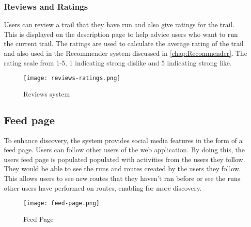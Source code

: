 \subsubsection{Reviews and Ratings}
Users can review a trail that they have run and also give ratings for the trail. This is displayed on the description page to help advice users who want to run the current trail. The ratings are used to calculate the average rating of the trail and also used in the Recommender system discussed in \autoref{chap:Recommender}. The rating scale \cite{wright1982rating} from 1-5, 1 indicating strong dislike and 5 indicating strong like.

\begin{figure}[htb!]
    \centering
    \texttt{[image: reviews-ratings.png]}
    \caption{Reviews system}
    \label{fig:reviews}
\end{figure}

\subsection{Feed page}
To enhance discovery, the system provides social media features in the form of a feed page. Users can follow other users of the web application. By doing this, the users feed page is populated populated with activities from the users they follow. They would be able to see the runs and routes created by the users they follow. This allows users to see new routes that they haven't ran before or see the runs other users have performed on routes, enabling for more discovery.

\begin{figure}[htb!]
    \centering
    \texttt{[image: feed-page.png]}
    \caption{Feed Page}
    \label{fig:feedPage}
\end{figure}




